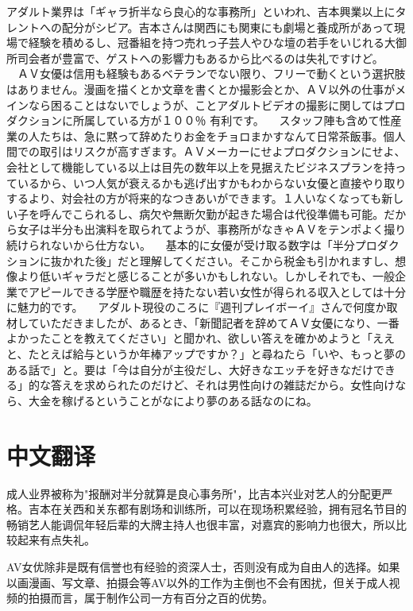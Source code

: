 \documentclass[12pt,UTF8]{ctexbook}
\begin{document}
アダルト業界は「ギャラ折半なら良心的な事務所」といわれ、吉本興業以上にタレントへの配分がシビア。吉本さんは関西にも関東にも劇場と養成所があって現場で経験を積めるし、冠番組を持つ売れっ子芸人やひな壇の若手をいじれる大御所司会者が豊富で、ゲストへの影響力もあるから比べるのは失礼ですけど。
　ＡＶ女優は信用も経験もあるベテランでない限り、フリーで動くという選択肢はありません。漫画を描くとか文章を書くとか撮影会とか、ＡＶ以外の仕事がメインなら困ることはないでしょうが、ことアダルトビデオの撮影に関してはプロダクションに所属している方が１００％
 有利です。
　スタッフ陣も含めて性産業の人たちは、急に黙って辞めたりお金をチョロまかすなんて日常茶飯事。個人間での取引はリスクが高すぎます。ＡＶメーカーにせよプロダクションにせよ、会社として機能している以上は目先の数年以上を見据えたビジネスプランを持っているから、いつ人気が衰えるかも逃げ出すかもわからない女優と直接やり取りするより、対会社の方が将来的なつきあいができます。１人いなくなっても新しい子を呼んでこられるし、病欠や無断欠勤が起きた場合は代役準備も可能。だから女子は半分も出演料を取られてようが、事務所がなきゃＡＶをテンポよく撮り続けられないから仕方ない。
　基本的に女優が受け取る数字は「半分プロダクションに抜かれた後」だと理解してください。そこから税金も引かれますし、想像より低いギャラだと感じることが多いかもしれない。しかしそれでも、一般企業でアピールできる学歴や職歴を持たない若い女性が得られる収入としては十分に魅力的です。
　アダルト現役のころに『週刊プレイボーイ』さんで何度か取材していただきましたが、あるとき、「新聞記者を辞めてＡＶ女優になり、一番よかったことを教えてください」と聞かれ、欲しい答えを確かめようと「ええと、たとえば給与というか年棒アップですか？」と尋ねたら「いや、もっと夢のある話で」と。要は「今は自分が主役だし、大好きなエッチを好きなだけできる」的な答えを求められたのだけど、それは男性向けの雑誌だから。女性向けなら、大金を稼げるということがなにより夢のある話なのにね。



\section*{中文翻译}

成人业界被称为"报酬对半分就算是良心事务所"，比吉本兴业对艺人的分配更严格。吉本在关西和关东都有剧场和训练所，可以在现场积累经验，拥有冠名节目的畅销艺人能调侃年轻后辈的大牌主持人也很丰富，对嘉宾的影响力也很大，所以比较起来有点失礼。

AV女优除非是既有信誉也有经验的资深人士，否则没有成为自由人的选择。如果以画漫画、写文章、拍摄会等AV以外的工作为主倒也不会有困扰，但关于成人视频的拍摄而言，属于制作公司一方有百分之百的优势。
\end{document}
